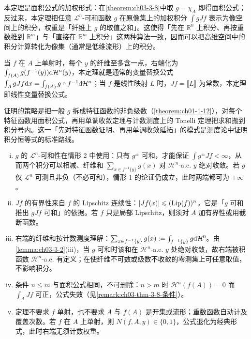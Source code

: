 \documentclass[../../main.tex]{subfiles}%
\begin{document}
\begin{remark}\label{remark:ch03-thm-3-9-动机}
本定理是面积公式的加权形式：在\cref{theorem:ch03-3-8}中取 $g=\chi_A$ 即得面积公式；反过来，本定理把任意 $\mathcal{L}^n$-可和函数 $g$ 在原像集上的加权积分 $\int gJf$ 表示为像空间上的积分，权重是「纤维上 $g$ 的取值之和」。这使得「先在 $\mathbb{R}^n$ 上积分、再按重数推到 $\mathbb{R}^m$」与「直接在 $\mathbb{R}^m$ 上积分」这两种算法一致，因而可以把高维空间中的积分计算转化为像集（通常是低维流形）上的积分。%

当 $f$ 在 $A$ 上单射时，每个 $y$ 的纤维至多含一点，右端化为 $\int_{f(A)}g(f^{-1}(y))\mathrm{d}\mathcal{H}^n(y)$，本定理就是通常的变量替换公式 $\int_AgJf\mathrm{d} x=\int_{f(A)}g\circ f^{-1}\mathrm{d}\mathcal{H}^n$；当 $f$ 是线性映射 $L$ 时，$Jf=\llbracket L\rrbracket$ 为常数，本定理即线性变量替换公式。

证明的策略是把一般 $g$ 拆成特征函数的非负级数（\cref{theorem:ch01-1-12}），对每个特征函数用面积公式，再用单调收敛定理与计数测度上的 Tonelli 定理把求和搬到积分号内。这一「先对特征函数证明、再用单调收敛延拓」的模式是测度论中证明积分恒等式的标准路线。%
\end{remark}

\begin{remark}\label{remark:ch03-thm-3-9-条件}
\begin{enumerate}[(i)]
\item $g$ 的 $\mathcal{L}^n$-可和性在情形 2 中使用：只有 $g^\pm$ 可和，才能保证 $\int g^\pm Jf<\infty$，从而两个积分可以相减、纤维和 $\sum_{x\in f^{-1}\{y\}}g(x)$ 对 $\mathcal{H}^n$-a.e. $y$ 绝对收敛。若 $g$ 仅 $\mathcal{L}^n$-可测且非负（不必可和），情形 1 的论证仍成立，此时两端都可为 $+\infty$。
\item $Jf$ 的有界性来自 $f$ 的 Lipschitz 连续性：$\lvert Jf(x)\rvert\leqslant(\operatorname{Lip}(f))^n$，它是「$g$ 可和推出 $gJf$ 可和」的依据。若 $f$ 只是局部 Lipschitz，则须对 $A$ 加有界性或用截断函数。
\item 右端的纤维和按计数测度理解：$\sum_{x\in f^{-1}\{y\}}g(x):=\int_{f^{-1}\{y\}}g\mathrm{d}\mathcal{H}^0$。由\cref{lemma:ch03-3-2}(iii)，当 $g$ 可和时该和在 $\mathcal{H}^n$-a.e. $y$ 处绝对收敛，故右端被积函数 $\mathcal{H}^n$-a.e. 有定义；在使纤维不可数或级数不收敛的零测集上可任意取值，不影响积分。%
\item 条件 $n\leqslant m$ 与面积公式相同，不可删除：$n>m$ 时 $\mathcal{H}^n(f(A))=0$ 而 $\int_AJf$ 可正，公式失效（见\cref{remark:ch03-thm-3-8-条件}）。%
\item 定理不要求 $f$ 单射，也不要求 $A$ 与 $f(A)$ 是开集或流形；重数函数自动计及覆盖次数。若 $f$ 在 $A$ 上单射，则 $N(f,A,y)\in\{0,1\}$，公式退化为经典形式，此时右端无须计数权重。
\end{enumerate}
\end{remark}
\end{document}
